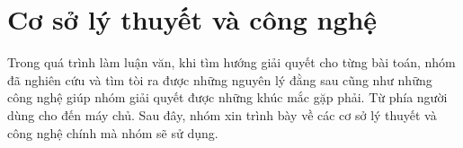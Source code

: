 \chapter{Cơ sở lý thuyết và công nghệ}\label{chap:Tech}
		Trong quá trình làm luận văn, khi tìm hướng giải quyết cho từng bài toán, nhóm đã
		nghiên cứu và tìm tòi ra được những nguyên lý đằng sau cũng như những công nghệ giúp
		nhóm giải quyết được những khúc mắc gặp phải. Từ phía người dùng cho đến máy chủ. Sau đây, nhóm xin trình bày về các cơ sở lý thuyết và công nghệ chính mà nhóm sẽ sử dụng.
		
	
	
	